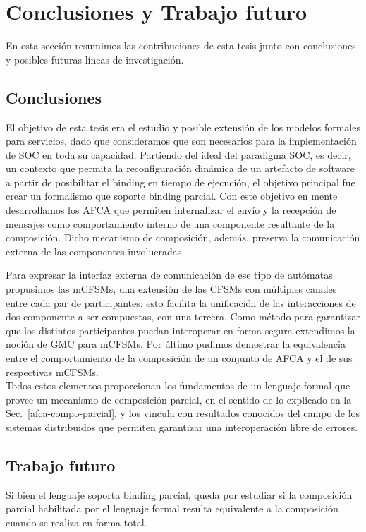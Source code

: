 \newpage
\chapter{Conclusiones y Trabajo futuro} 
\label{conclusiones}

En esta sección resumimos las contribuciones de esta tesis junto con conclusiones y posibles futuras líneas de investigación.


\section{Conclusiones} 

El objetivo de esta tesis era el estudio y posible extensión de los modelos formales para servicios, dado que consideramos que son necesarios para la implementación de SOC en toda su capacidad. Partiendo del ideal del paradigma SOC, es decir, un contexto que permita la reconfiguración dinámica de un artefacto de software a partir de posibilitar el binding en tiempo de ejecución, el objetivo principal fue crear un formalismo que soporte binding parcial. Con este objetivo en mente desarrollamos los AFCA que permiten internalizar el envío y la recepción de mensajes como comportamiento interno de una componente resultante de la composición. Dicho mecanismo de composición, además, preserva la comunicación externa de las componentes involucradas.

Para expresar la interfaz externa de comunicación de ese tipo de autómatas propusimos las mCFSMs, una extensión de las CFSMs con múltiples canales entre cada par de participantes. esto facilita la unificación de las interacciones de dos componente a ser compuestas, con una tercera. Como método para garantizar que los distintos participantes puedan interoperar en forma segura extendimos la noción de GMC para mCFSMs. Por último pudimos demostrar la equivalencia entre el comportamiento de la composición de un conjunto de AFCA y el de sus respectivas mCFSMs.\\

Todos estos elementos proporcionan los fundamentos de un lenguaje formal que provee un mecanismo de composición parcial, en el sentido de lo explicado en la Sec.~\ref{afca-compo-parcial}, y los vincula con resultados conocidos del campo de los sistemas distribuidos que permiten garantizar una interoperación libre de errores.


\section{Trabajo futuro}

Si bien el lenguaje soporta binding parcial, queda por estudiar si la composición parcial habilitada por el lenguaje formal resulta equivalente a la composición cuando se realiza en forma total.

